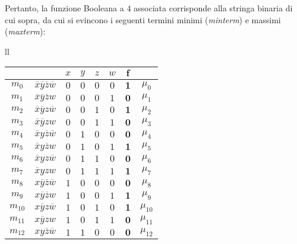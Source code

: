 \documentclass[a4paper]{extarticle}
\begin{document}
\newpage
\noindent
Pertanto, la funzione Booleana a \(4\) associata corrisponde alla stringa binaria di cui sopra, da cui si evincono i seguenti termini minimi (\emph{minterm}) e massimi (\emph{maxterm}):

\noindent
\begin{table}[H]
  \setlength{\tabcolsep}{5.6pt}
  \hspace{-1em}
  \begin{tabularx}{\textwidth}{ll}
    {
        \noindent
        \begin{tabular}{c|c||cccc||c|c}
          $ $ & $ $ & $x$ & $y$ & $z$ & $w$ & $\boldsymbol{f}$\\
          \hline
          $m_0$ & $\overline{x}\overline{y}\overline{z}\overline{w}$ & $0$ & $0$ & $0$ & $0$ & $\boldsymbol{1}$ & $\mu_0$\\
          $m_1$ & $\overline{x}\overline{y}\overline{z}w$ & $0$ & $0$ & $0$ & $1$ & $\boldsymbol{0}$ & $\mu_1$\\
          $m_2$ & $\overline{x}\overline{y}z\overline{w}$ & $0$ & $0$ & $1$ & $0$ & $\boldsymbol{1}$ & $\mu_2$\\
          $m_3$ & $\overline{x}\overline{y}zw$ & $0$ & $0$ & $1$ & $1$ & $\boldsymbol{0}$ & $\mu_3$\\
          $m_4$ & $\overline{x}y\overline{z}\overline{w}$ & $0$ & $1$ & $0$ & $0$ & $\boldsymbol{0}$ & $\mu_4$\\
          $m_5$ & $\overline{x}y\overline{z}w$ & $0$ & $1$ & $0$ & $1$ & $\boldsymbol{1}$ & $\mu_5$\\
          $m_6$ & $\overline{x}yz\overline{w}$ & $0$ & $1$ & $1$ & $0$ & $\boldsymbol{0}$ & $\mu_6$\\
          $m_7$ & $\overline{x}yzw$ & $0$ & $1$ & $1$ & $1$ & $\boldsymbol{1}$ & $\mu_7$\\
          $m_8$ & $x\overline{y}\overline{z}\overline{w}$ & $1$ & $0$ & $0$ & $0$ & $\boldsymbol{0}$ & $\mu_8$\\
          $m_9$ & $x\overline{y}\overline{z}w$ & $1$ & $0$ & $0$ & $1$ & $\boldsymbol{1}$ & $\mu_9$\\
          $m_{10}$ & $x\overline{y}z\overline{w}$ & $1$ & $0$ & $1$ & $0$ & $\boldsymbol{1}$ & $\mu_{10}$\\
          $m_{11}$ & $x\overline{y}zw$ & $1$ & $0$ & $1$ & $1$ & $\boldsymbol{0}$ & $\mu_{11}$\\
          $m_{12}$ & $xy\overline{z}\overline{w}$ & $1$ & $1$ & $0$ & $0$ & $\boldsymbol{0}$ & $\mu_{12}$\\

\end{tabular}}
\end{tabularx}
\end{table}
\end{document}
